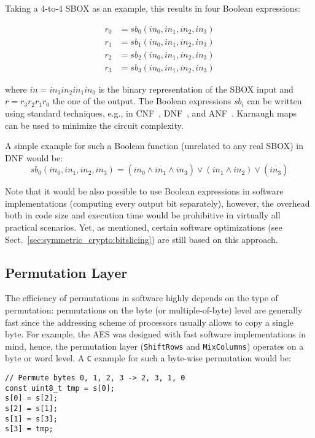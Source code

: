 Taking a 4-to-4 \ac{SBOX} as an example, this results in four Boolean expressions:

\begin{align}
	r_0 &= sb_0 \left(in_0, in_1, in_2, in_3 \right) \nonumber \\
	r_1 &= sb_1 \left(in_0, in_1, in_2, in_3 \right) \nonumber \\
	r_2 &= sb_2 \left(in_0, in_1, in_2, in_3 \right) \nonumber \\
	r_3 &= sb_3 \left(in_0, in_1, in_2, in_3 \right) \nonumber
\end{align}

where $in = in_3 in_2 in_1 in_0$ is the binary representation of the \ac{SBOX} input and $r = r_3 r_2 r_1 r_0$ the one of the output. The Boolean expressions $sb_i$ can be written using standard techniques, e.g., in \ac{CNF}~\cite{wiki:cnf}, \ac{DNF}~\cite{wiki:dnf}, and \ac{ANF}~\cite{wiki:anf}. Karnaugh maps~\cite{wiki:karnaugh} can be used to minimize the circuit complexity.

A simple example for such a Boolean function (unrelated to any real \ac{SBOX}) in \ac{DNF} would be:
$$
sb_0 \left(in_0, in_1, in_2, in_3 \right) = \left(in_0 \wedge \overline{in_1} \wedge in_3\right) \vee \left(in_1 \wedge in_2\right) \vee \left(\overline{in_3}\right)
$$

Note that it would be also possible to use Boolean expressions in software implementations (computing every output bit separately), however, the overhead both in code size and execution time would be prohibitive in virtually all practical scenarios. Yet, as mentioned, certain software optimizations (see Sect.~\ref{sec:symmetric_crypto:bitslicing}) are still based on this approach.

\subsection{Permutation Layer}
The efficiency of permutations in software highly depends on the type of permutation: permutations on the byte (or multiple-of-byte) level are generally fast since the addressing scheme of processors usually allows to copy a single byte. For example, the \ac{AES} was designed with fast software implementations in mind, hence, the permutation layer (\verb+ShiftRows+ and \verb+MixColumns+) operates on a byte or word level. A \verb+C+ example for such a byte-wise permutation would be:

\lstset{language=C}
\begin{lstlisting}
// Permute bytes 0, 1, 2, 3 -> 2, 3, 1, 0
const uint8_t tmp = s[0];
s[0] = s[2];
s[2] = s[1];
s[1] = s[3];
s[3] = tmp;

\end{lstlisting}

